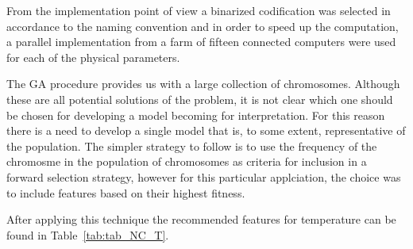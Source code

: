 {{From the implementation point of view a binarized codification was
selected in accordance to the naming convention and in order to speed
up the computation, a parallel implementation from a farm of fifteen
connected computers were used for each of the physical parameters.  }


{ The GA procedure provides us with a large collection of chromosomes.
  Although these are all potential solutions of the problem, it is not
  clear which one should be chosen for developing a model becoming for
  interpretation.  For this reason there is a need to develop a single
  model that is, to some extent, representative of the population. The
  simpler strategy to follow is to use the frequency of the chromosme
  in the population of chromosomes as criteria for inclusion in a
  forward selection strategy, however for this particular applciation,
  the choice was to include features based on their highest fitness.

After applying this technique the recommended features for temperature 
can be found in Table~\ref{tab:tab_NC_T}. 

}}
